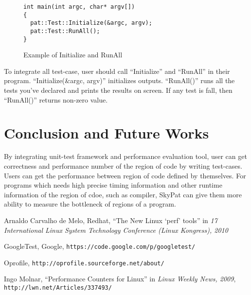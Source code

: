 \documentclass[final]{ols}
\begin{document}
\begin{figure}[h]
\lstset{language=C++}
\begin{lstlisting}[frame=single]
int main(int argc, char* argv[])
{
  pat::Test::Initialize(&argc, argv);
  pat::Test::RunAll();
}
\end{lstlisting}
\caption{Example of Initialize and RunAll}
\label{main_example}
\end{figure}

To integrate all test-case, user should call ``Initialize'' and ``RunAll'' in their program.
``Initialize(\&argc, argv)'' initializes outputs.
``RunAll()'' runs all the tests you've declared and prints the results on screen.
If any test is fall, then ``RunAll()'' returns non-zero value.

\section{Conclusion and Future Works}
By integrating unit-test framework and performance evaluation tool, user can get correctness and performance number of the region of code by writing test-cases.
Users can get the performance between region of code defined by themselves.
For programs which needs high precise timing information and other runtime information of the region of cdoe, such as compiler, SkyPat can give them more ability to measure the bottleneck of regions of a program.

\begin{thebibliography}{99}  %
Arnaldo Carvalho de Melo, Redhat, ``The New Linux `perf' tools'' in \emph{17 International Linux System Technology Conference (Linux Kongress), 2010}

GoogleTest, Google, \texttt{\small https://code.google.com/p/googletest/}

Oprofile, \texttt{\small \newline http://oprofile.sourceforge.net/about/}

Ingo Molnar, ``Performance Counters for Linux'' in \emph{Linux Weekly News, 2009}, \texttt{\small http://lwn.net/Articles/337493/}

\end{thebibliography}
\end{document}

